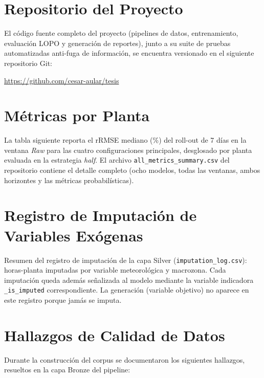 \section{Repositorio del Proyecto}
El código fuente completo del proyecto (pipelines de datos, entrenamiento, evaluación LOPO y generación de reportes), junto a su suite de pruebas automatizadas anti-fuga de información, se encuentra versionado en el siguiente repositorio Git:

\begin{center}
\url{https://github.com/cesar-aular/tesis}
\end{center}

\section{Métricas por Planta}
La tabla siguiente reporta el rRMSE mediano (\%) del roll-out de 7 días en la ventana \textit{Raw} para las cuatro configuraciones principales, desglosado por planta evaluada en la estrategia \textit{half}. El archivo \texttt{all\_metrics\_summary.csv} del repositorio contiene el detalle completo (ocho modelos, todas las ventanas, ambos horizontes y las métricas probabilísticas).



\section{Registro de Imputación de Variables Exógenas}
Resumen del registro de imputación de la capa Silver (\texttt{imputation\_log.csv}): horas-planta imputadas por variable meteorológica y macrozona. Cada imputación queda además señalizada al modelo mediante la variable indicadora \texttt{\_is\_imputed} correspondiente. La generación (variable objetivo) no aparece en este registro porque jamás se imputa.

\begin{table}[hbt!]
  \centering
  
  \caption{Horas-planta imputadas en la capa Silver por variable exógena y macrozona.}
\end{table}

\section{Hallazgos de Calidad de Datos}
Durante la construcción del corpus se documentaron los siguientes hallazgos, resueltos en la capa Bronze del pipeline:


